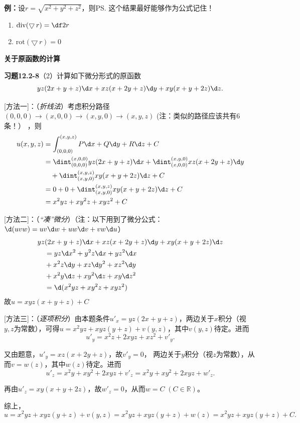 {\bf 例：}设$r=\sqrt{x^2+y^2+z^2}$，则\ps{这个结果最好能够作为公式记住！}
\begin{enumerate}[(1)]
  \setlength{\itemindent}{1cm}
  \item $\mathrm{div}(\bigtriangledown\,r)=\df 2r$
  \item $\mathrm{rot}(\bigtriangledown\,r)=0$
\end{enumerate}

\begin{shaded}
	{\bf 关于原函数的计算}	
	
	{\bf 习题12.2-8}（2）计算如下微分形式的原函数
	$$yz(2x+y+z)\d x+xz(x+2y+z)\d y+xy(x+y+2z)\d z.$$
	
	[方法一]：（{\it 折线法}）考虑积分路径$(0,0,0)\to(x,0,0)\to(x,y,0)\to(x,y,z)$
	(注：类似的路径应该共有6条！）
	，则
	\begin{align*}
		u(x,y,z)&=\int_{(0,0,0)}^{(x,y,z)}P\d x+Q\d y+R\d z+C\\
		&=\dint_{(0,0,0)}^{(x,0,0)}yz(2x+y+z)\d x
		+\dint_{(x,0,0)}^{(x,y,0)}xz(x+2y+z)\d y\\
		&\quad+\dint_{(x,y,0)}^{(x,y,z)}xy(x+y+2z)\d z+C\\
		&=0+0+\dint_{(x,y,0)}^{(x,y,z)}xy(x+y+2z)\d z+C\\
		&=x^2yz+xy^2z+xyz^2+C
	\end{align*}
	
	[方法二]：（{\it “凑”微分}）（注：以下用到了微分公式：$\d(uvw)=uv\d w+uw\d v+vw\d u$）
	\begin{align*}
		yz&(2x+y+z)\d x+xz(x+2y+z)\d y+xy(x+y+2z)\d z\\
		&=yz\d x^2+y^2z\d x+yz^2\d x\\
		&+x^2z\d y+xz\d y^2+xz^2\d y\\
		&+x^2y\d z+xy^2\d z+xy\d z^2\\
		&=\d(x^2yz+xy^2z+xyz^2)
	\end{align*}
	故$u=xyz(x+y+z)+C$
	
	[方法三]：（{\it 逐项积分}）由本题条件$u'_x=yz(2x+y+z)$，两边关于$x$积分（视
	$y,z$为常数），可得$u=x^2yz+xyz(y+z)+v(y,z)$，其中$v(y,z)$待定。进而
	$$u'_y=x^2z+2xyz+xz^2+v'_y.$$	
	
	又由题意，$u'_y=xz(x+2y+z)$，故$v'_y=0$，
	两边关于$y$积分（视$z$为常数），从而$v=w(z)$，其中$w(z)$待定。进而
	$$u'_z=x^2y+xy^2+2xyz+v'_z=x^2y+xy^2+2xyz+w'_z.$$
	
	再由$u'_z=xy(x+y+2z)$，故$w'_z=0$，从而$w=C\;(C\in\mathbb{R})$。
	
	综上，
	$$u=x^2yz+xyz(y+z)+v(y,z)=x^2yz+xyz(y+z)+w(z)=x^2yz+xyz(y+z)+C.$$
	
\end{shaded}

